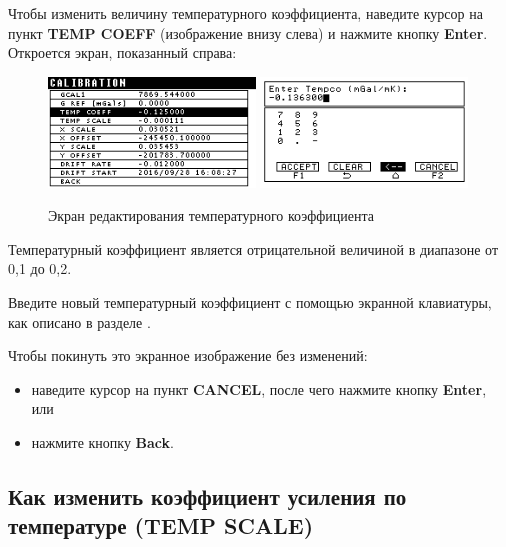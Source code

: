 Чтобы изменить величину температурного коэффициента, наведите курсор на пункт
\textbf{TEMP COEFF} (изображение внизу слева) и нажмите кнопку \textbf{Enter}.
Откроется экран, показанный справа:

\begin{figure}[H]
  \centering
  \includegraphics[width=0.49\textwidth]{figures/the_temperature_coefficient_editing_screen_1}
  \includegraphics[width=0.49\textwidth]{figures/the_temperature_coefficient_editing_screen_2}
  \caption{Экран редактирования температурного коэффициента}
  \label{fig:the_temperature_coefficient_editing_screen}
\end{figure}

Температурный коэффициент является отрицательной величиной в диапазоне от
\textminus{}0,1 до \textminus{}0,2.

Введите новый температурный коэффициент с помощью экранной клавиатуры, как
описано в разделе .

Чтобы покинуть это экранное изображение без изменений:
\begin{itemize}
  \item наведите курсор на пункт \textbf{CANCEL}, после чего нажмите кнопку
    \textbf{Enter}, или

  \item нажмите кнопку \textbf{Back}.
\end{itemize}

\subsection{Как изменить коэффициент усиления по температуре (TEMP SCALE)}


